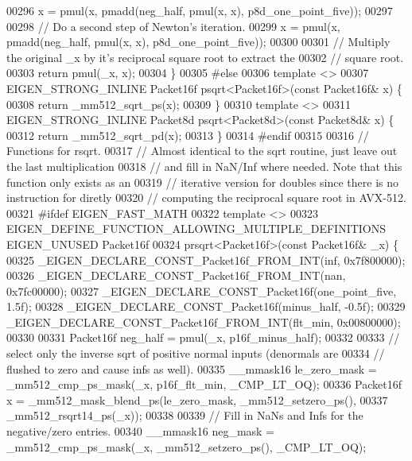 \begin{DoxyCode}
00296   x = pmul(x, pmadd(neg\_half, pmul(x, x), p8d\_one\_point\_five));
00297 
00298   \textcolor{comment}{// Do a second step of Newton's iteration.}
00299   x = pmul(x, pmadd(neg\_half, pmul(x, x), p8d\_one\_point\_five));
00300 
00301   \textcolor{comment}{// Multiply the original \_x by it's reciprocal square root to extract the}
00302   \textcolor{comment}{// square root.}
00303   \textcolor{keywordflow}{return} pmul(\_x, x);
00304 \}
00305 \textcolor{preprocessor}{#else}
00306 \textcolor{keyword}{template} <>
00307 EIGEN\_STRONG\_INLINE Packet16f psqrt<Packet16f>(\textcolor{keyword}{const} Packet16f& x) \{
00308   \textcolor{keywordflow}{return} \_mm512\_sqrt\_ps(x);
00309 \}
00310 \textcolor{keyword}{template} <>
00311 EIGEN\_STRONG\_INLINE Packet8d psqrt<Packet8d>(\textcolor{keyword}{const} Packet8d& x) \{
00312   \textcolor{keywordflow}{return} \_mm512\_sqrt\_pd(x);
00313 \}
00314 \textcolor{preprocessor}{#endif}
00315 
00316 \textcolor{comment}{// Functions for rsqrt.}
00317 \textcolor{comment}{// Almost identical to the sqrt routine, just leave out the last multiplication}
00318 \textcolor{comment}{// and fill in NaN/Inf where needed. Note that this function only exists as an}
00319 \textcolor{comment}{// iterative version for doubles since there is no instruction for diretly}
00320 \textcolor{comment}{// computing the reciprocal square root in AVX-512.}
00321 \textcolor{preprocessor}{#ifdef EIGEN\_FAST\_MATH}
00322 \textcolor{keyword}{template} <>
00323 EIGEN\_DEFINE\_FUNCTION\_ALLOWING\_MULTIPLE\_DEFINITIONS EIGEN\_UNUSED Packet16f
00324 prsqrt<Packet16f>(\textcolor{keyword}{const} Packet16f& \_x) \{
00325   \_EIGEN\_DECLARE\_CONST\_Packet16f\_FROM\_INT(inf, 0x7f800000);
00326   \_EIGEN\_DECLARE\_CONST\_Packet16f\_FROM\_INT(nan, 0x7fc00000);
00327   \_EIGEN\_DECLARE\_CONST\_Packet16f(one\_point\_five, 1.5f);
00328   \_EIGEN\_DECLARE\_CONST\_Packet16f(minus\_half, -0.5f);
00329   \_EIGEN\_DECLARE\_CONST\_Packet16f\_FROM\_INT(flt\_min, 0x00800000);
00330 
00331   Packet16f neg\_half = pmul(\_x, p16f\_minus\_half);
00332 
00333   \textcolor{comment}{// select only the inverse sqrt of positive normal inputs (denormals are}
00334   \textcolor{comment}{// flushed to zero and cause infs as well).}
00335   \_\_mmask16 le\_zero\_mask = \_mm512\_cmp\_ps\_mask(\_x, p16f\_flt\_min, \_CMP\_LT\_OQ);
00336   Packet16f x = \_mm512\_mask\_blend\_ps(le\_zero\_mask, \_mm512\_setzero\_ps(),
00337                                      \_mm512\_rsqrt14\_ps(\_x));
00338 
00339   \textcolor{comment}{// Fill in NaNs and Infs for the negative/zero entries.}
00340   \_\_mmask16 neg\_mask = \_mm512\_cmp\_ps\_mask(\_x, \_mm512\_setzero\_ps(), \_CMP\_LT\_OQ);

\end{DoxyCode}
